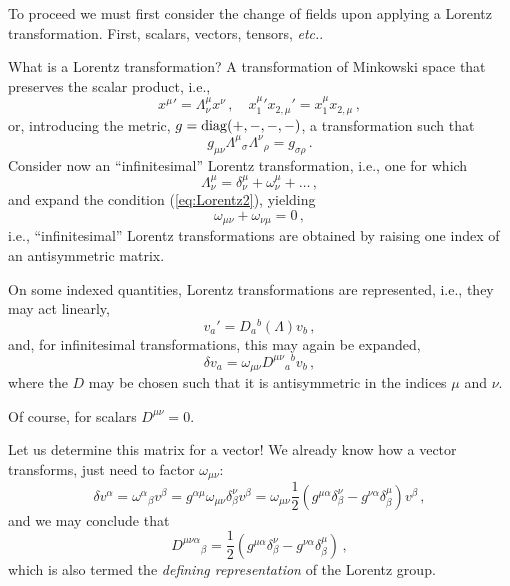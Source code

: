 \documentclass[a4paper,12pt]{article}
\begin{document}
To proceed we must first consider the change of fields upon applying a Lorentz transformation. First, scalars, vectors, tensors, {\sl etc.}.

What is a Lorentz transformation? A transformation of Minkowski space that preserves the scalar product, i.e.,
\begin{equation}\label{eq:Lorentz}
 x^\mu{}'=\Lambda^\mu_\nu x^\nu\,,\quad x_1^\mu{}' x_{2,\mu}' = x_1^\mu x_{2,\mu}\,,
\end{equation}
or, introducing the metric, $g={\rm diag}(+,-,-,-)$, a transformation such that
\begin{equation}\label{eq:Lorentz2}
 g_{\mu\nu}\Lambda^\mu{}_\sigma \Lambda^\nu{}_\rho = g_{\sigma\rho}\,.
\end{equation}
Consider now an ``infinitesimal'' Lorentz transformation, i.e., one for which
\begin{equation}\label{eq:InfiLorentz}
 \Lambda^\mu_\nu = \delta^\mu_\nu + \omega^\mu_\nu + \dots\,,
\end{equation}
and expand the condition (\ref{eq:Lorentz2}), yielding
\begin{equation}\label{eq:InfiLorentz2}
 \omega_{\mu\nu}+\omega_{\nu\mu} = 0\,,
\end{equation}
i.e., ``infinitesimal'' Lorentz transformations are obtained by raising one index of an antisymmetric matrix.

On some indexed quantities, Lorentz transformations are represented, i.e., they may act linearly,
\begin{equation}\label{eq:rep}
 v_a' = D_a{}^b(\Lambda)v_b\,,
\end{equation}
and, for infinitesimal transformations, this may again be expanded,
\begin{equation}
 \delta v_a = \omega_{\mu\nu}D^{\mu\nu}{}_a{}^b v_b\,,
\end{equation}
where the $D$ may be chosen such that it is antisymmetric in the indices $\mu$ and $\nu$.

Of course, for scalars $D^{\mu\nu} = 0$.

Let us determine this matrix for a vector! We already know how a vector transforms, just need to factor $\omega_{\mu\nu}$:
\begin{equation}\label{eq:vectrf}
 \delta v^\alpha = \omega^\alpha{}_\beta v^\beta = g^{\alpha\mu}\omega_{\mu\nu}\delta^\nu_\beta v^\beta = \omega_{\mu\nu}\frac{1}{2}\left( g^{\mu\alpha}\delta^\nu_\beta - g^{\nu\alpha}\delta^\mu_\beta\right) v^\beta\,,
\end{equation}
and we may conclude that
\begin{equation}\label{eq:DefRep}
 D^{\mu\nu\alpha}{}_\beta = \frac{1}{2}\left( g^{\mu\alpha}\delta^\nu_\beta - g^{\nu\alpha}\delta^\mu_\beta\right)\,,
\end{equation}
which is also termed the \emph{defining representation} of the Lorentz group.
\end{document}
